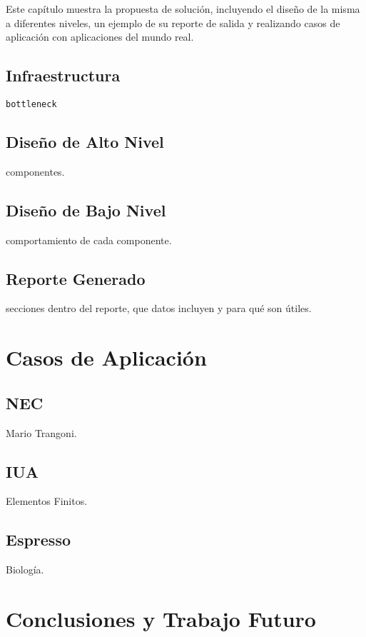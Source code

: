 \documentclass[a4paper]{report}
\begin{document}
Este capítulo muestra la propuesta de solución, incluyendo el diseño de la misma a diferentes niveles, un ejemplo de su reporte de salida y realizando casos de aplicación con aplicaciones del mundo real.

\section{Infraestructura}

{\tt bottleneck}

\section{Diseño de Alto Nivel}

componentes.

\section{Diseño de Bajo Nivel}

comportamiento de cada componente.

\section{Reporte Generado}

secciones dentro del reporte, que datos incluyen y para qué son útiles.

\chapter{Casos de Aplicación}

\section{NEC}

Mario Trangoni.

\section{IUA}

Elementos Finitos.

\section{Espresso}

Biología.

\chapter{Conclusiones y Trabajo Futuro}
\end{document}
